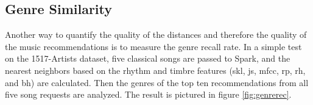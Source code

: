 \subsection{Genre Similarity}\label{genrerec}

Another way to quantify the quality of the distances and therefore the quality of the music recommendations is to measure the genre recall rate. In a simple test on the 1517-Artists dataset, five classical songs are passed to Spark, and the nearest neighbors based on the rhythm and timbre features (skl, js, mfcc, rp, rh, and bh) are calculated. Then the genres of the top ten recommendations from all five song requests are analyzed. The result is pictured in figure \ref{fig:genrerec}.  

\begin{figure}[htbp]
	\centering
\end{figure}
